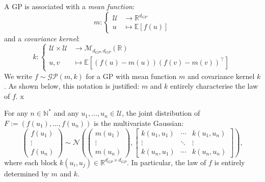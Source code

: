 A GP is associated with a \emph{mean function}:
\begin{equation}
	m:\left\{\begin{aligned}
	\mathcal{U}&\rightarrow\mathbb{R}^{d_{GP}}\\
	u&\mapsto\mathbb{E}[f(u)]
	\end{aligned}\right.
	\label{eq:GP_mean}
\end{equation}
and a \emph{covariance kernel}:
\begin{equation}
	k:\left\{\begin{aligned}
	\mathcal{U}\times\mathcal{U}&\rightarrow\mathcal{M}_{d_{GP},d_{GP}}(\mathbb{R})\\
	u,v&\mapsto\mathbb{E}[(f(u)-m(u))(f(v)-m(v))^\top]
	\end{aligned}\right.
	\label{eq:GP_kernel}
\end{equation}
We write $f\sim\mathcal{GP}(m,k)$ for a GP with mean function $m$ and covariance kernel $k$. As shown below, this notation is justified: $m$ and $k$ entirely characterise the law of $f$.
x
\begin{proposition}
	\label{prop:GP_marginal}
	For any $n\in\mathbb{N}^*$ and any $u_1,\dots,u_n\in\mathcal{U}$, the joint
	distribution of $F:=(f(u_1),\dots,f(u_n))$ is the multivariate Gaussian:
	\begin{equation}
		\begin{pmatrix} f(u_1) \\ \vdots \\ f(u_n) \end{pmatrix}
		\sim \mathcal{N}\!\left(
			\begin{pmatrix} m(u_1) \\ \vdots \\ m(u_n) \end{pmatrix},
			\begin{bmatrix}
				k(u_1, u_1) & \cdots & k(u_1, u_n) \\
				\vdots       & \ddots & \vdots       \\
				k(u_n, u_1) & \cdots & k(u_n, u_n)
			\end{bmatrix}
		\right),
		\label{eq:GP_marginal}
	\end{equation}
	where each block $k(u_i,u_j)\in\mathbb{R}^{d_{GP}\times d_{GP}}$. In
	particular, the law of $f$ is entirely determined by $m$ and $k$.
\end{proposition}

